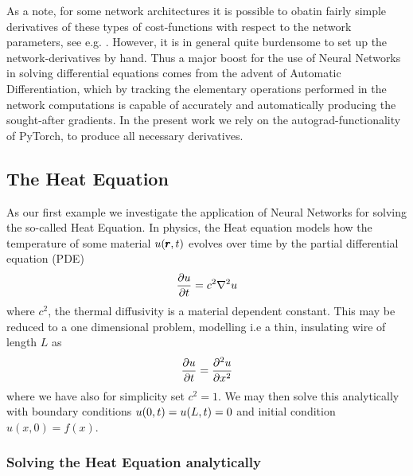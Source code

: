 \documentclass[reprint, english, nofootinbib]{revtex4-2}
\begin{document}
As a note, for some network architectures it is possible to obatin fairly simple derivatives of these types of cost-functions with respect to the network parameters, see e.g. \cite{Lagaris_1998}. However, it is in general quite burdensome to set up the network-derivatives by hand. Thus a major boost for the use of Neural Networks in solving differential equations comes from the advent of Automatic Differentiation, which by tracking the elementary operations performed in the network computations is capable of accurately and automatically producing the sought-after gradients. In the present work we rely on the autograd-functionality of PyTorch, to produce all necessary derivatives.

\subsection{The Heat Equation}

As our first example we investigate the application of Neural Networks for solving the so-called Heat Equation. In physics, the Heat equation models how the temperature of some material $u\qty(\pmb r, t)$ evolves over time by the partial differential equation (PDE)
\begin{equation}
    \pdv{u}{t} = c^2\nabla^2 u 
\end{equation}
where $c^2$, the thermal diffusivity is a material dependent constant. 
This may be reduced to a one dimensional problem, modelling i.e a thin, insulating wire of length $L$ as
\begin{equation}\label{eqn: 1D heat eqn}
    \pdv{u}{t} = \pdv[2]{u}{x}
\end{equation}
where we have also for simplicity set $c^2 = 1$. We may then solve this analytically with boundary conditions $u\qty(0, t) = u\qty(L,t) = 0$ and initial condition $u(x, 0) = f(x)$.

\subsubsection{Solving the Heat Equation analytically}
\noindent 
\end{document}

